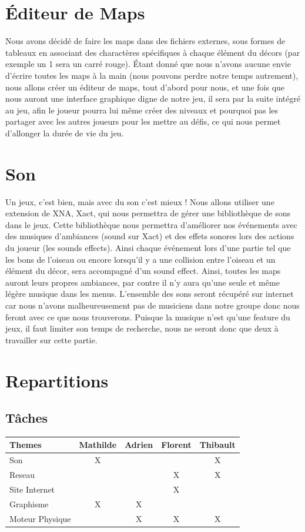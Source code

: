 \documentclass [11pt]{report}
\begin{document}
	\section {\'Editeur de Maps}
		Nous avons décidé de faire les maps dans des fichiers externes, sous formes de tableaux en associant des charactères spécifiques à chaque élément du décors (par exemple un 1 sera un carré rouge). \'Etant donné que nous n'avons aucune envie d'écrire toutes les maps à la main (nous pouvons perdre notre temps autrement), 		nous allons créer un éditeur de maps, tout d'abord pour nous, et une fois que nous auront une interface graphique digne de notre jeu, il sera par la suite intégré au jeu, afin le joueur pourra lui même créer des niveaux et pourquoi pas les partager avec les autres joueurs pour les mettre au défis, ce qui nous permet d'allonger la durée de 		vie du jeu.\\\vspace{5mm}


\newpage
	\section {Son}
		Un jeux, c'est bien, mais avec du son c'est mieux ! Nous allons utiliser une extension de XNA, Xact, qui nous permettra de g\'erer une biblioth\`eque de sons dans le jeux. Cette biblioth\`eque nous permettra d'am\'eliorer nos \'ev\'enements avec des musiques d'ambiances (sound sur Xact) et des effets sonores lors des actions du 		joueur (les sounds effects). Ainsi chaque événement lors d'une partie tel que les bons de l'oiseau ou encore lorsqu'il y a une collision entre l'oiseau et un élément du décor, sera accompagné d'un sound effect. Ainsi, toutes les maps auront leurs propres ambiances, par contre il n'y aura qu'une seule et même légère musique dans les menus. 	L'ensemble des sons seront récupéré sur internet car nous n'avons malheureusement pas de musiciens dans notre groupe donc nous feront avec ce que nous trouverons. Puisque la musique n'est qu'une feature du jeux, il faut limiter son temps de recherche, nous ne seront donc que deux à travailler sur cette partie.

	\section{Repartitions}
		\subsection{Tâches}
			\begin{tabular}{| l |*{4} {c|}}
				\hline
				Themes & Mathilde & Adrien & Florent & Thibault \\
				\hline
				Son & X & & & X \\
				\hline
				Reseau & & & X & X \\
				\hline
				Site Internet & & & X & \\
				\hline
				Graphisme & X & X & & \\
				\hline
				Moteur Physique & & X & X & X\\
				\hline
			\end{tabular}\\\vspace{3mm}
\end{document}
